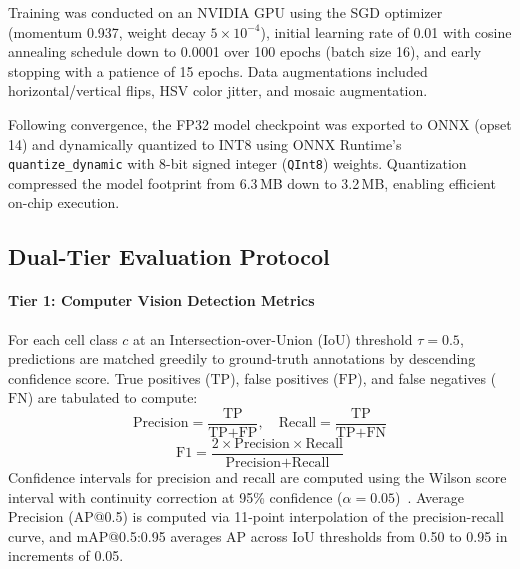 \documentclass[10pt,conference]{IEEEtran}
\begin{document}
Training was conducted on an NVIDIA GPU using the SGD optimizer (momentum 0.937, weight decay $5 \times 10^{-4}$), initial learning rate of 0.01 with cosine annealing schedule down to 0.0001 over 100 epochs (batch size 16), and early stopping with a patience of 15 epochs. Data augmentations included horizontal/vertical flips, HSV color jitter, and mosaic augmentation.

Following convergence, the FP32 model checkpoint was exported to ONNX (opset 14) and dynamically quantized to INT8 using ONNX Runtime's \texttt{quantize\_dynamic} with 8-bit signed integer (\texttt{QInt8}) weights. Quantization compressed the model footprint from 6.3\,MB down to 3.2\,MB, enabling efficient on-chip execution.

\subsection{Dual-Tier Evaluation Protocol}
\paragraph{Tier 1: Computer Vision Detection Metrics}
For each cell class $c$ at an Intersection-over-Union (IoU) threshold $\tau = 0.5$, predictions are matched greedily to ground-truth annotations by descending confidence score. True positives ($\text{TP}$), false positives ($\text{FP}$), and false negatives ($\text{FN}$) are tabulated to compute:
\begin{equation}
\text{Precision} = \frac{\text{TP}}{\text{TP} + \text{FP}}, \quad \text{Recall} = \frac{\text{TP}}{\text{TP} + \text{FN}}
\end{equation}
\begin{equation}
\text{F1} = \frac{2 \times \text{Precision} \times \text{Recall}}{\text{Precision} + \text{Recall}}
\end{equation}
Confidence intervals for precision and recall are computed using the Wilson score interval with continuity correction at 95\% confidence ($\alpha = 0.05$)~\cite{wilson1927}. Average Precision (AP@0.5) is computed via 11-point interpolation of the precision-recall curve, and mAP@0.5:0.95 averages AP across IoU thresholds from 0.50 to 0.95 in increments of 0.05.
\end{document}
